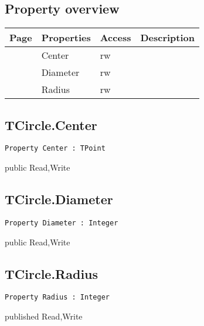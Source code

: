 \subsection{Property overview}
\label{hmi:drawncontrol:tcircle:properties}
\begin{tabularx}{\textwidth}{lllX}
Page & Properties & Access & Description \\ \hline
\pageref{hmi:drawncontrol:tcircle:center} & Center & rw &  \\
\pageref{hmi:drawncontrol:tcircle:diameter} & Diameter & rw &  \\
\pageref{hmi:drawncontrol:tcircle:radius} & Radius & rw &  \\
\hline
\end{tabularx}
\subsection{TCircle.Center}
\label{hmi:drawncontrol:tcircle:center}
\begin{FPCList}
\Declaration 

\begin{verbatim}
Property Center : TPoint
\end{verbatim}
\Visibility
public
\Access
Read,Write
\end{FPCList}
\subsection{TCircle.Diameter}
\label{hmi:drawncontrol:tcircle:diameter}
\begin{FPCList}
\Declaration 

\begin{verbatim}
Property Diameter : Integer
\end{verbatim}
\Visibility
public
\Access
Read,Write
\end{FPCList}
\subsection{TCircle.Radius}
\label{hmi:drawncontrol:tcircle:radius}
\begin{FPCList}
\Declaration 

\begin{verbatim}
Property Radius : Integer
\end{verbatim}
\Visibility
published
\Access
Read,Write
\end{FPCList}
